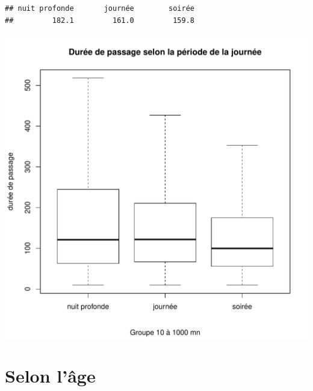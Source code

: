 \documentclass[12pt,english,french,twoside]{report}\usepackage[]{graphicx}\usepackage[]{color}
\makeatletter
\def\maxwidth{ %
  \ifdim\Gin@nat@width>\linewidth
    \linewidth
  \else
    \Gin@nat@width
  \fi
}
\newenvironment{kframe}{%
 \def\at@end@of@kframe{}%
 \ifinner\ifhmode%
  \def\at@end@of@kframe{\end{minipage}}%
  \begin{minipage}{\columnwidth}%
 \fi\fi%
 \def\FrameCommand##1{\hskip\@totalleftmargin \hskip-\fboxsep
 \colorbox{shadecolor}{##1}\hskip-\fboxsep
     \hskip-\linewidth \hskip-\@totalleftmargin \hskip\columnwidth}%
 \MakeFramed {\advance\hsize-\width
   \@totalleftmargin\z@ \linewidth\hsize
   \@setminipage}}%
 {\par\unskip\endMakeFramed%
 \at@end@of@kframe}
\newenvironment{knitrout}{}{} %
\makeatother
\begin{document}
\begin{knitrout}
\begin{kframe}\begin{verbatim}
## nuit profonde       journée        soirée 
##         182.1         161.0         159.8
\end{verbatim}
\end{kframe}
\includegraphics[width=\maxwidth]{figure/duree_heure3} 

\end{knitrout}


\section*{Selon l'âge}
\end{document}
